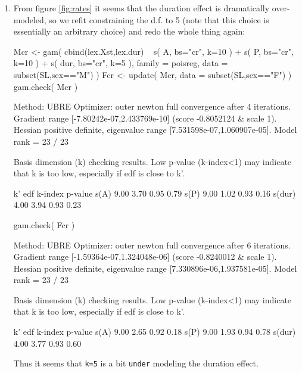 \begin{enumerate}[resume]
\item From figure \ref{fig:rates} it seems that the duration effect is
dramatically over-modeled, so we refit constraining the d.f. to 5 (note
that this choice is essentially an arbitrary choice) and redo the whole
thing again:
\begin{Schunk}
\begin{Sinput}
 Mcr <- gam( cbind(lex.Xst,lex.dur) ~ s(   A, bs="cr", k=10 ) +
                                      s(   P, bs="cr", k=10 ) +
                                      s( dur, bs="cr", k=5 ),
                   family = poisreg, 
                     data = subset(SL,sex=="M") )
 Fcr <- update( Mcr, data = subset(SL,sex=="F") )
 gam.check( Mcr )
\end{Sinput}
\begin{Soutput}
Method: UBRE   Optimizer: outer newton
full convergence after 4 iterations.
Gradient range [-7.80242e-07,2.433769e-10]
(score -0.8052124 & scale 1).
Hessian positive definite, eigenvalue range [7.531598e-07,1.060907e-05].
Model rank =  23 / 23 

Basis dimension (k) checking results. Low p-value (k-index<1) may
indicate that k is too low, especially if edf is close to k'.

         k'  edf k-index p-value
s(A)   9.00 3.70    0.95    0.79
s(P)   9.00 1.02    0.93    0.16
s(dur) 4.00 3.94    0.93    0.23
\end{Soutput}
\begin{Sinput}
 gam.check( Fcr )
\end{Sinput}
\begin{Soutput}
Method: UBRE   Optimizer: outer newton
full convergence after 6 iterations.
Gradient range [-1.59364e-07,1.324048e-06]
(score -0.8240012 & scale 1).
Hessian positive definite, eigenvalue range [7.330896e-06,1.937581e-05].
Model rank =  23 / 23 

Basis dimension (k) checking results. Low p-value (k-index<1) may
indicate that k is too low, especially if edf is close to k'.

         k'  edf k-index p-value
s(A)   9.00 2.65    0.92    0.18
s(P)   9.00 1.93    0.94    0.78
s(dur) 4.00 3.77    0.93    0.60
\end{Soutput}
\end{Schunk}
Thus it seems that \texttt{k=5} is a bit \texttt{under} modeling the
duration effect.


\end{enumerate}
